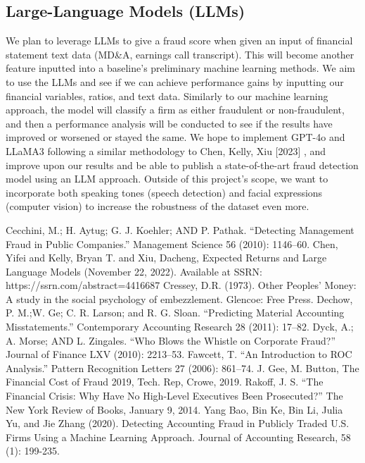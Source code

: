 \documentclass[conference]{IEEEtran}
\begin{document}
\subsection{Large-Language Models (LLMs)}
We plan to leverage LLMs to give a fraud score when given an input of financial statement text data (MD\&A, earnings call transcript). This will become another feature inputted into a baseline's preliminary machine learning methods. We aim to use the LLMs and see if we can achieve performance gains by inputting our financial variables, ratios, and text data. Similarly to our machine learning approach, the model will classify a firm as either fraudulent or non-fraudulent, and then a performance analysis will be conducted to see if the results have improved or worsened or stayed the same. We hope to implement GPT-4o and LLaMA3 following a similar methodology to Chen, Kelly, Xiu [2023] \cite{b2}, and improve upon our results and be able to publish a state-of-the-art fraud detection model using an LLM approach. Outside of this project's scope, we want to incorporate both speaking tones (speech detection) and facial expressions (computer vision) to increase the robustness of the dataset even more. 


\begin{thebibliography}{00}
 Cecchini, M.; H. Aytug; G. J. Koehler; AND P. Pathak. “Detecting Management Fraud in Public Companies.” Management Science 56 (2010): 1146–60.
 Chen, Yifei and Kelly, Bryan T. and Xiu, Dacheng, Expected Returns and Large Language Models (November 22, 2022). Available at SSRN: https://ssrn.com/abstract=4416687
 Cressey, D.R. (1973). Other Peoples’ Money: A study in the social psychology of embezzlement. Glencoe: Free Press.
 Dechow, P. M.;W. Ge; C. R. Larson; and R. G. Sloan. “Predicting Material Accounting Misstatements.”
Contemporary Accounting Research 28 (2011): 17–82.
 Dyck, A.; A. Morse; AND L. Zingales. “Who Blows the Whistle on Corporate Fraud?” Journal of Finance LXV (2010): 2213–53.
 Fawcett, T. “An Introduction to ROC Analysis.” Pattern Recognition Letters 27 (2006): 861–74.
 J. Gee, M. Button, The Financial Cost of Fraud 2019, Tech. Rep, Crowe, 2019.
 Rakoff, J. S. “The Financial Crisis: Why Have No High-Level Executives Been Prosecuted?”
The New York Review of Books, January 9, 2014.
 Yang Bao, Bin Ke, Bin Li, Julia Yu, and Jie Zhang (2020). Detecting Accounting Fraud in Publicly Traded U.S. Firms Using a Machine Learning Approach. Journal of Accounting Research, 58 (1): 199-235.
\end{thebibliography}
\end{document}
